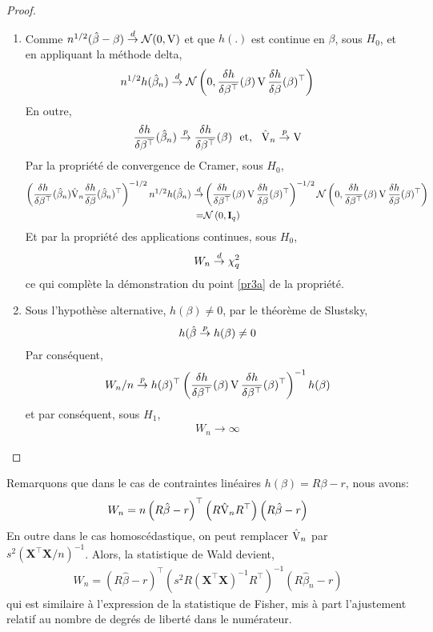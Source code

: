 \begin{proof} 
\begin{enumerate}
\item Comme $n^{1/2}(\hat{\beta}- \beta) \overset{d}{\rightarrow} \mathcal{N}(0, \operatorname{V})$ et que $h(.)$ est continue en $\beta$, sous $H_0$, et en appliquant la méthode delta,
\begin{align*}
n^{1/2}h(\hat{\beta}_n) \overset{d}{\rightarrow} \mathcal{N}\left(0, \frac{\delta h}{\delta \beta^\top}(\beta) \operatorname{V} \frac{\delta h}{\delta \beta}(\beta)^\top \right)
\end{align*}
En outre,
\begin{align*}
\frac{\delta h}{\delta \beta^\top}(\hat{\beta}_n) \overset{p}{\rightarrow} \frac{\delta h}{\delta \beta^\top}(\beta) \ \ \textrm{et}, \ \ \hat{\operatorname{V}}_n \overset{p}{\rightarrow} \operatorname{V}
\end{align*}
Par la propriété de convergence de Cramer, sous $H_0$,
\begin{align*}
\left(\frac{\delta h}{\delta \beta ^ \top}(\hat{\beta}_n)\hat{\operatorname{V}}_n \frac{\delta h}{\delta \beta}(\hat{\beta}_n)^\top \right)^{-1/2}n^{1/2} h(\hat{\beta}_n) 
\overset{d}{\rightarrow} & \left(\frac{\delta h}{\delta \beta^\top}(\beta) \operatorname{V} \frac{\delta h}{\delta \beta}(\beta)^\top\right)^{-1/2} \mathcal{N}\left(0, \frac{\delta h}{\delta \beta^\top}(\beta) \operatorname{V} \frac{\delta h}{\delta \beta}(\beta)^\top\right)\\
= & \mathcal{N}\left(0, \mathbf{I}_q \right)
\end{align*}
Et par la propriété des applications continues, sous $H_0$,
\begin{align*}
W_n \overset{d}{\rightarrow} \chi^2_q
\end{align*}
ce qui complète la démonstration du point \ref{pr3a} de la propriété.
\item Sous l'hypothèse alternative, $h(\beta)\neq 0$, par le théorème de Slustsky,
\begin{align*}
h(\hat{\beta}\overset{p}{\rightarrow} h(\beta) \neq 0
\end{align*}
Par conséquent, 
\begin{align*}
W_n /n \overset{p}{\rightarrow} h(\beta)^\top\left(\frac{\delta h}{\delta \beta^\top}(\beta) \operatorname{V} \frac{\delta h}{\delta \beta^\top}(\beta)^\top \right)^{-1} h(\beta)
\end{align*}
et par conséquent, sous $H_1$, 
\begin{align*}
W_n \rightarrow \infty
\end{align*}
\end{enumerate}
\end{proof}
Remarquons que dans le cas de contraintes linéaires $h(\beta) = R\beta - r$, nous avons:
\begin{align*}
W_n = n\left(R\hat{\beta}- r\right)^\top\left(R\hat{\operatorname{V}}_nR^\top\right)\left(R\hat{\beta}- r\right)
\end{align*}
En outre dans le cas homoscédastique, on peut remplacer $\hat{\operatorname{V}}_n$ par $s^2(\mathbf{X}^\top\mathbf{X}/n)^{-1}$. Alors, la statistique de Wald devient,
\begin{align*}
W_n = \left(R\hat{\beta}- r\right)^\top\left(s^2R(\mathbf{X}^\top\mathbf{X})^{-1}R^\top\right)^{-1}\left(R\hat{\beta}_n-r\right)
\end{align*}
qui est similaire à l'expression de la statistique de Fisher, mis à part l'ajustement relatif au nombre de degrés de liberté dans le numérateur.


